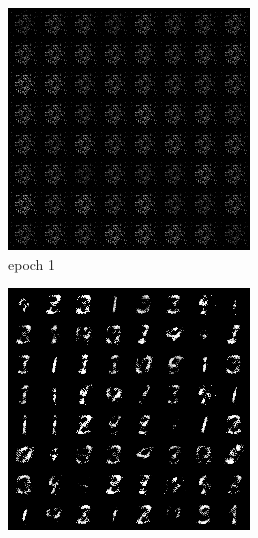 \documentclass[a4paper]{article}
\theoremstyle{definition}
\newenvironment{soln}{
	\leavevmode\color{blue}\ignorespaces
}{}
\begin{document}
\begin{enumerate} [label=(\alph*)]
\begin{soln}
		\begin{figure}[H]
			\centering
			\begin{subfigure}[b]{0.3\textwidth}
				\centering
				\includegraphics[width=\textwidth]{images/q1c_gen_img1.png}
				\caption{epoch 1}
			\end{subfigure}
			\hfill
			\begin{subfigure}[b]{0.3\textwidth}
				\centering
				\includegraphics[width=\textwidth]{images/q1c_gen_img50.png}

\end{subfigure}
\end{figure}
\end{soln}
\end{enumerate}
\end{document}
